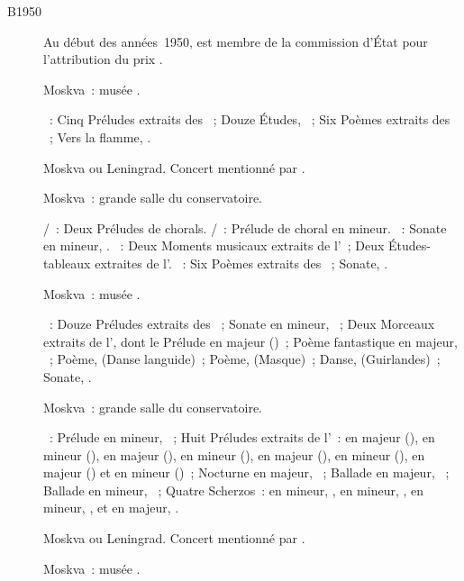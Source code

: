 \begin{description}
 \item[B1950]
 Au début des années~1950, \VSofronitsky{} est membre de la commission
 d'\hbox{État} pour l'attribution du prix \Staline{}.
 \item[]
 Moskva~: musée \Scriabine{}.

 \textsc{\Scriabine{}}~: Cinq Préludes extraits des ~;
 Douze Études, ~; Six Poèmes extraits des ~; Vers la flamme, .
 \item[]
 Moskva ou Leningrad.
 Concert mentionné par \citet[p.~171]{Nekrasova08}.
 \item[]
 Moskva~: grande salle du conservatoire.

 \textsc{\JBach{}/\Busoni{}}~: Deux Préludes de chorals.
 \textsc{\JBach{}/\Ziloti{}}~: Prélude de choral en \kB mineur.
 \textsc{\Beethoven{}}~: Sonate en \kF mineur, .
 \textsc{\Rachmaninov{}}~: Deux Moments musicaux extraits de l'~;
 Deux Études-tableaux extraites de l'.
 \textsc{\Scriabine{}}~: Six Poèmes extraits des ~; Sonate, .
 \item[]
 Moskva~: musée \Scriabine{}.

 \textsc{\Scriabine{}}~: Douze Préludes extraits des ~;
 Sonate en \kF \Sharp mineur, ~; Deux Morceaux extraits de
 l', dont le Prélude en \kE majeur ()~; Poème fantastique
 en \kC majeur, ~; Poème,   (Danse languide)~;
 Poème,   (Masque)~; Danse,  
 (Guirlandes)~; Sonate, .
 \item[]
 Moskva~: grande salle du conservatoire.

 \textsc{\Chopin{}}~: Prélude en \kC \Sharp mineur, ~; Huit
 Préludes extraits de l'~: en \kD \Flat majeur (), en
 \kB \Flat mineur (), en \kA \Flat majeur (), en \kF
 mineur (), en \kE \Flat majeur (), en \kC mineur
 (), en \kB \Flat majeur () et en \kG mineur
 ()~; Nocturne en \kE \Flat majeur,  ~; Ballade
 en \kF majeur, ~; Ballade en \kF mineur, ~; Quatre
 Scherzos~:  en \kB mineur, ,  en \kB \Flat
 mineur, ,  en \kC \Sharp mineur, , et
  en \kE majeur, .
 \item[]
 Moskva ou Leningrad.
 Concert mentionné par \citet[p.~171]{Nekrasova08}.
 \item[]
 Moskva~: musée \Scriabine{}.


\end{description}
